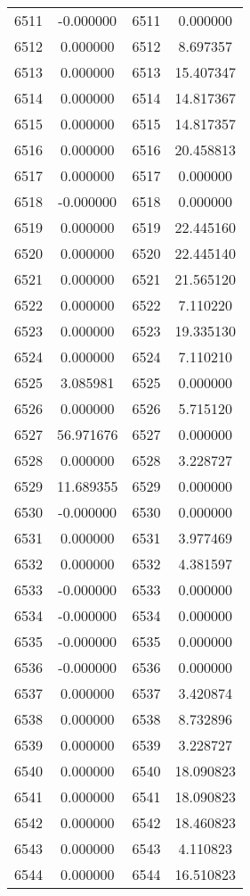 \documentclass[12pt]{article}
\begin{document}
\begin{longtable}{@{}cccc@{}}
6511 & -0.000000 & 6511 & 0.000000 \\
6512 & 0.000000 & 6512 & 8.697357 \\
6513 & 0.000000 & 6513 & 15.407347 \\
6514 & 0.000000 & 6514 & 14.817367 \\
6515 & 0.000000 & 6515 & 14.817357 \\
6516 & 0.000000 & 6516 & 20.458813 \\
6517 & 0.000000 & 6517 & 0.000000 \\
6518 & -0.000000 & 6518 & 0.000000 \\
6519 & 0.000000 & 6519 & 22.445160 \\
6520 & 0.000000 & 6520 & 22.445140 \\
6521 & 0.000000 & 6521 & 21.565120 \\
6522 & 0.000000 & 6522 & 7.110220 \\
6523 & 0.000000 & 6523 & 19.335130 \\
6524 & 0.000000 & 6524 & 7.110210 \\
6525 & 3.085981 & 6525 & 0.000000 \\
6526 & 0.000000 & 6526 & 5.715120 \\
6527 & 56.971676 & 6527 & 0.000000 \\
6528 & 0.000000 & 6528 & 3.228727 \\
6529 & 11.689355 & 6529 & 0.000000 \\
6530 & -0.000000 & 6530 & 0.000000 \\
6531 & 0.000000 & 6531 & 3.977469 \\
6532 & 0.000000 & 6532 & 4.381597 \\
6533 & -0.000000 & 6533 & 0.000000 \\
6534 & -0.000000 & 6534 & 0.000000 \\
6535 & -0.000000 & 6535 & 0.000000 \\
6536 & -0.000000 & 6536 & 0.000000 \\
6537 & 0.000000 & 6537 & 3.420874 \\
6538 & 0.000000 & 6538 & 8.732896 \\
6539 & 0.000000 & 6539 & 3.228727 \\
6540 & 0.000000 & 6540 & 18.090823 \\
6541 & 0.000000 & 6541 & 18.090823 \\
6542 & 0.000000 & 6542 & 18.460823 \\
6543 & 0.000000 & 6543 & 4.110823 \\
6544 & 0.000000 & 6544 & 16.510823 \\

\end{longtable}
\end{document}
